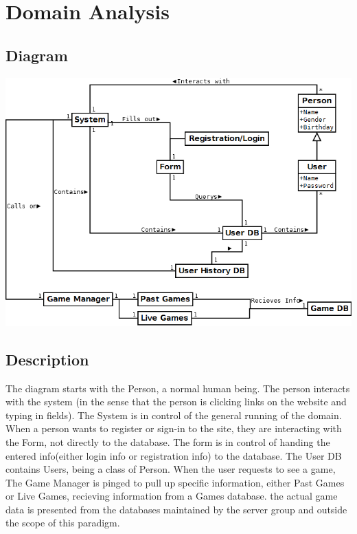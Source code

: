 %

\section{Domain Analysis}

	\subsection{Diagram}
		\includegraphics[width=1.0\textwidth]{./Diagram1.png}

	\subsection{Description}
		The diagram starts with the Person, a normal human being. The person interacts with the system (in the sense that the person is clicking links on the website and typing in fields). The System is in control of the general running of the domain. When a person wants to register or sign-in to the site, they are interacting with the Form, not directly to the database. The form is in control of handing the entered info(either login info or registration info) to the database. The User DB contains Users, being a class of Person. When the user requests to see a game, The Game Manager is pinged to pull up specific information, either Past Games or Live Games, recieving information from a Games database. the actual game data is presented from the databases maintained by the server group and outside the scope of this paradigm. 

\newpage